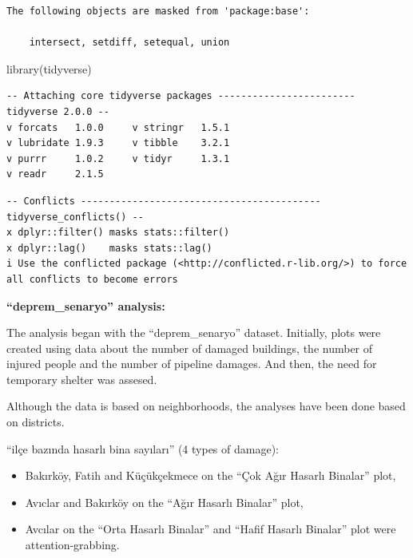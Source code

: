 \documentclass[
  11pt,
  a4paper,
  DIV=11,
  numbers=noendperiod]{scrartcl}
\newenvironment{Shaded}{\begin{snugshade}}{\end{snugshade}}
\newcommand{\FunctionTok}[1]{\textcolor[rgb]{0.28,0.35,0.67}{#1}}
\newcommand{\NormalTok}[1]{\textcolor[rgb]{0.00,0.23,0.31}{#1}}
\begin{document}
\begin{verbatim}
The following objects are masked from 'package:base':

    intersect, setdiff, setequal, union
\end{verbatim}

\begin{Shaded}
\begin{Highlighting}[]
\FunctionTok{library}\NormalTok{(tidyverse)}
\end{Highlighting}
\end{Shaded}

\begin{verbatim}
-- Attaching core tidyverse packages ------------------------ tidyverse 2.0.0 --
v forcats   1.0.0     v stringr   1.5.1
v lubridate 1.9.3     v tibble    3.2.1
v purrr     1.0.2     v tidyr     1.3.1
v readr     2.1.5     
\end{verbatim}

\begin{verbatim}
-- Conflicts ------------------------------------------ tidyverse_conflicts() --
x dplyr::filter() masks stats::filter()
x dplyr::lag()    masks stats::lag()
i Use the conflicted package (<http://conflicted.r-lib.org/>) to force all conflicts to become errors
\end{verbatim}

\textbf{``deprem\_senaryo'' analysis:}

The analysis began with the ``deprem\_senaryo'' dataset. Initially,
plots were created using data about the number of damaged buildings, the
number of injured people and the number of pipeline damages. And then,
the need for temporary shelter was assesed.

Although the data is based on neighborhoods, the analyses have been done
based on districts.

``ilçe bazında hasarlı bina sayıları'' (4 types of damage):

\begin{itemize}
\item
  Bakırköy, Fatih and Küçükçekmece on the ``Çok Ağır Hasarlı Binalar''
  plot,
\item
  Avıclar and Bakırköy on the ``Ağır Hasarlı Binalar'' plot,
\item
  Avcılar on the ``Orta Hasarlı Binalar'' and ``Hafif Hasarlı Binalar''
  plot were attention-grabbing.
\end{itemize}
\end{document}
